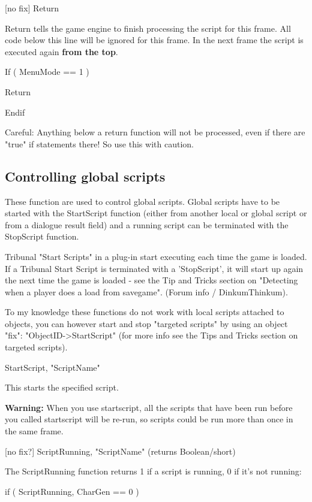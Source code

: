 {[}no fix{]} Return

Return tells the game engine to finish processing the script for this
frame. All code below this line will be ignored for this frame. In the
next frame the script is executed again \textbf{from the top}.

If ( MenuMode == 1 )

Return

Endif

Careful: Anything below a return function will not be processed, even if
there are "true" if statements there! So use this with caution.

\hypertarget{controlling-global-scripts}{%
\subsection{Controlling global
scripts}\label{controlling-global-scripts}}

These function are used to control global scripts. Global scripts have
to be started with the StartScript function (either from another local
or global script or from a dialogue result field) and a running script
can be terminated with the StopScript function.

Tribunal "Start Scripts" in a plug-in start executing each time the game
is loaded. If a Tribunal Start Script is terminated with a 'StopScript',
it will start up again the next time the game is loaded - see the Tip
and Tricks section on "Detecting when a player does a load from
savegame". (Forum info / DinkumThinkum).

To my knowledge these functions do not work with local scripts attached
to objects, you can however start and stop "targeted scripts" by using
an object "fix": "ObjectID-\textgreater StartScript" (for more info see
the Tips and Tricks section on targeted scripts).

StartScript, "ScriptName"

This starts the specified script.

\textbf{Warning:} When you use startscript, all the scripts that have
been run before you called startscript will be re-run, so scripts could
be run more than once in the same frame.

{[}no fix?{]} ScriptRunning, "ScriptName" (returns Boolean/short)

The ScriptRunning function returns 1 if a script is running, 0 if it's
not running:

if ( ScriptRunning, CharGen == 0 )

